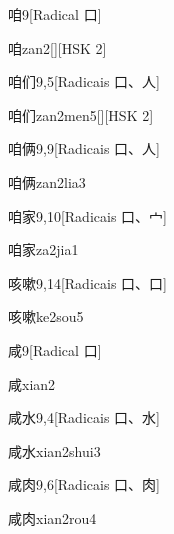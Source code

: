 \begin{entry}{咱}{9}[Radical ⼝]
  \begin{phonetics}{咱}{zan2}[][HSK 2]
  \end{phonetics}
\end{entry}

\begin{entry}{咱们}{9,5}[Radicais ⼝、⼈]
  \begin{phonetics}{咱们}{zan2men5}[][HSK 2]
  \end{phonetics}
\end{entry}

\begin{entry}{咱俩}{9,9}[Radicais ⼝、⼈]
  \begin{phonetics}{咱俩}{zan2lia3}
  \end{phonetics}
\end{entry}

\begin{entry}{咱家}{9,10}[Radicais ⼝、⼧]
  \begin{phonetics}{咱家}{za2jia1}
  \end{phonetics}
\end{entry}

\begin{entry}{咳嗽}{9,14}[Radicais ⼝、⼝]
  \begin{phonetics}{咳嗽}{ke2sou5}
  \end{phonetics}
\end{entry}

\begin{entry}{咸}{9}[Radical ⼝]
  \begin{phonetics}{咸}{xian2}
  \end{phonetics}
\end{entry}

\begin{entry}{咸水}{9,4}[Radicais ⼝、⽔]
  \begin{phonetics}{咸水}{xian2shui3}
  \end{phonetics}
\end{entry}

\begin{entry}{咸肉}{9,6}[Radicais ⼝、⾁]
  \begin{phonetics}{咸肉}{xian2rou4}
  \end{phonetics}
\end{entry}

